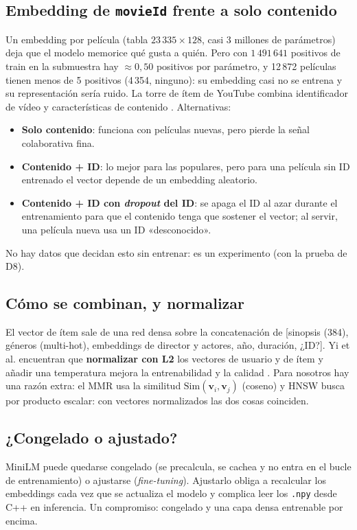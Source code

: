 \documentclass[a4paper,11pt]{article}
\begin{document}
\subsection{Embedding de \texttt{movieId} frente a solo contenido}
Un embedding por película (tabla $23\,335\times128$, casi 3 millones de parámetros) deja que el modelo memorice qué gusta
a quién. Pero con $1\,491\,641$ positivos de train en la submuestra hay $\approx0{,}50$ positivos por parámetro, y 12\,872 películas
tienen menos de 5 positivos (4\,354, ninguno): su embedding casi no se entrena y su representación sería ruido. La torre de ítem de
YouTube combina identificador de vídeo y características de contenido \cite{yi2019}. Alternativas:
\begin{itemize}
  \item \textbf{Solo contenido}: funciona con películas nuevas, pero pierde la señal colaborativa fina.
  \item \textbf{Contenido + ID}: lo mejor para las populares, pero para una película sin ID entrenado el vector depende de un embedding aleatorio.
  \item \textbf{Contenido + ID con \emph{dropout} del ID}: se apaga el ID al azar durante el entrenamiento para que el contenido tenga
        que sostener el vector; al servir, una película nueva usa un ID «desconocido».
\end{itemize}
No hay datos que decidan esto sin entrenar: es un experimento (con la prueba de D8).

\subsection{Cómo se combinan, y normalizar}
El vector de ítem sale de una red densa sobre la concatenación de [sinopsis (384), géneros (multi-hot), embeddings de director y
actores, año, duración, ¿ID?]. Yi et al. encuentran que \textbf{normalizar con L2} los vectores de usuario y de ítem y añadir una temperatura
mejora la entrenabilidad y la calidad \cite{yi2019}. Para nosotros hay una razón extra: el MMR usa la similitud $\text{Sim}(\mathbf v_i,\mathbf v_j)$
(coseno) y HNSW busca por producto escalar: con vectores normalizados las dos cosas coinciden.

\subsection{¿Congelado o ajustado?}
MiniLM puede quedarse congelado (se precalcula, se cachea y no entra en el bucle de entrenamiento) o ajustarse (\emph{fine-tuning}). Ajustarlo
obliga a recalcular los embeddings cada vez que se actualiza el modelo y complica leer los \texttt{.npy} desde C++ en inferencia. Un compromiso:
congelado y una capa densa entrenable por encima.
\end{document}
